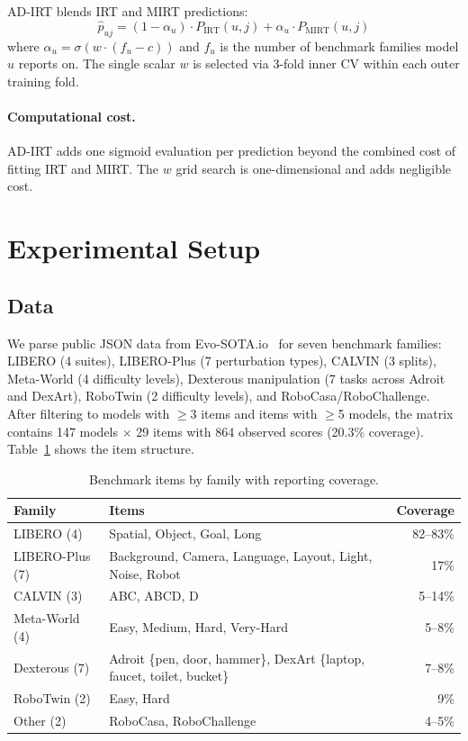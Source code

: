 \documentclass[11pt]{article}
\begin{document}
AD-IRT blends IRT and MIRT predictions:
\begin{equation}
\hat{p}_{uj} = (1 - \alpha_u) \cdot P_{\text{IRT}}(u,j) + \alpha_u \cdot P_{\text{MIRT}}(u,j)
\label{eq:adirt}
\end{equation}
where $\alpha_u = \sigma(w \cdot (f_u - c))$ and $f_u$ is the number of benchmark families model $u$ reports on. The single scalar $w$ is selected via 3-fold inner CV within each outer training fold.

\paragraph{Computational cost.} AD-IRT adds one sigmoid evaluation per prediction beyond the combined cost of fitting IRT and MIRT. The $w$ grid search is one-dimensional and adds negligible cost.

\section{Experimental Setup}

\subsection{Data}

We parse public JSON data from Evo-SOTA.io~\citep{evosota2026} for seven benchmark families: LIBERO (4 suites), LIBERO-Plus (7 perturbation types), CALVIN (3 splits), Meta-World (4 difficulty levels), Dexterous manipulation (7 tasks across Adroit and DexArt), RoboTwin (2 difficulty levels), and RoboCasa/RoboChallenge. After filtering to models with $\geq$3 items and items with $\geq$5 models, the matrix contains 147 models $\times$ 29 items with 864 observed scores (20.3\% coverage). Table~\ref{tab:items} shows the item structure.

\begin{table}[htbp]
\centering
\caption{Benchmark items by family with reporting coverage.}
\label{tab:items}
\small
\begin{tabular}{llr}
\toprule
Family & Items & Coverage \\
\midrule
LIBERO (4) & Spatial, Object, Goal, Long & 82--83\% \\
LIBERO-Plus (7) & Background, Camera, Language, Layout, Light, Noise, Robot & 17\% \\
CALVIN (3) & ABC, ABCD, D & 5--14\% \\
Meta-World (4) & Easy, Medium, Hard, Very-Hard & 5--8\% \\
Dexterous (7) & Adroit \{pen, door, hammer\}, DexArt \{laptop, faucet, toilet, bucket\} & 7--8\% \\
RoboTwin (2) & Easy, Hard & 9\% \\
Other (2) & RoboCasa, RoboChallenge & 4--5\% \\
\bottomrule
\end{tabular}
\end{table}
\end{document}
